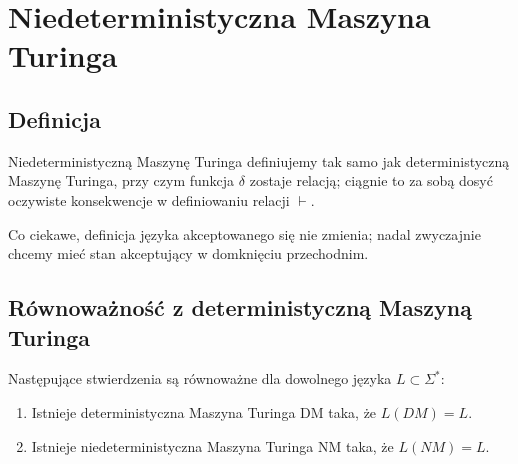 \section{Niedeterministyczna Maszyna Turinga}

\subsection{Definicja}

\begin{definition}
    Niedeterministyczną Maszynę Turinga definiujemy tak samo jak deterministyczną Maszynę Turinga, przy czym funkcja \( \delta \) zostaje relacją; ciągnie to za sobą dosyć oczywiste konsekwencje w definiowaniu relacji \( \vdash\).
    
    Co ciekawe, definicja języka akceptowanego się nie zmienia; nadal zwyczajnie chcemy mieć stan akceptujący w domknięciu przechodnim.
\end{definition}

\subsection{Równoważność z deterministyczną Maszyną Turinga}

\begin{theorem}
    Następujące stwierdzenia są równoważne dla dowolnego języka \( L \subset \Sigma^*\):
    \begin{enumerate}
        \item Istnieje deterministyczna Maszyna Turinga DM taka, że \(L(DM) = L\).
        \item Istnieje niedeterministyczna Maszyna Turinga NM taka, że \(L(NM) = L \). 
    \end{enumerate}
\end{theorem}

